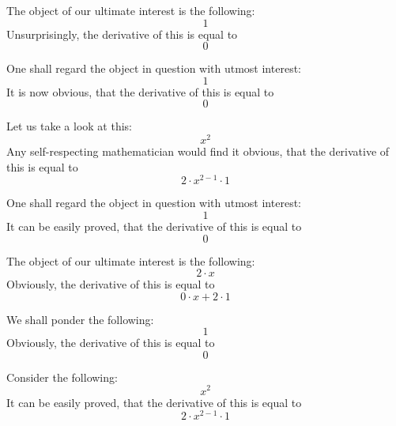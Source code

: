 \documentclass{article}
\begin{document}
The object of our ultimate interest is the following:
\begin{equation}
1 
\end{equation}
Unsurprisingly, the derivative of this is equal to
\begin{equation}
0 
\end{equation}

One shall regard the object in question with utmost interest:
\begin{equation}
1 
\end{equation}
It is now obvious, that the derivative of this is equal to
\begin{equation}
0 
\end{equation}

Let us take a look at this:
\begin{equation}
x ^{2 } 
\end{equation}
Any self-respecting mathematician would find it obvious, that the derivative of this is equal to
\begin{equation}
2 \cdot x ^{2 - 1 } \cdot 1 
\end{equation}

One shall regard the object in question with utmost interest:
\begin{equation}
1 
\end{equation}
It can be easily proved, that the derivative of this is equal to
\begin{equation}
0 
\end{equation}

The object of our ultimate interest is the following:
\begin{equation}
2 \cdot x 
\end{equation}
Obviously, the derivative of this is equal to
\begin{equation}
0 \cdot x + 2 \cdot 1 
\end{equation}

We shall ponder the following:
\begin{equation}
1 
\end{equation}
Obviously, the derivative of this is equal to
\begin{equation}
0 
\end{equation}

Consider the following:
\begin{equation}
x ^{2 } 
\end{equation}
It can be easily proved, that the derivative of this is equal to
\begin{equation}
2 \cdot x ^{2 - 1 } \cdot 1 
\end{equation}
\end{document}
